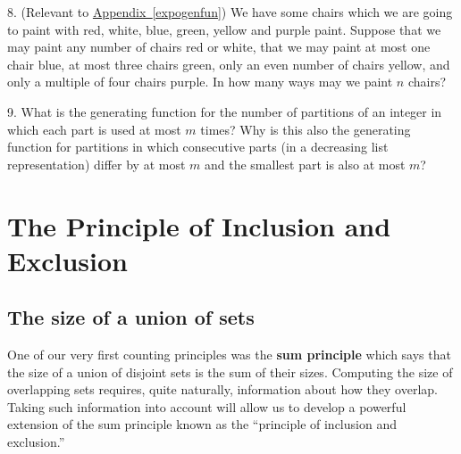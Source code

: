 \documentclass[10pt,]{book}
\newcommand{\terminology}[1]{\textbf{#1}}
\theoremstyle{plain}
\theoremstyle{definition}
\theoremstyle{definition}
\numberwithin{equation}{chapter}
\newcommand{\importantarrow}{\Rightarrow}
\begin{document}
\begin{exerciselist}
\par\smallskip
\item[8.]\marginsymbol[-1em]{\pdftooltip{$\importantarrow$}{especially interesting}} \hypertarget{exercise-44}{}\hypertarget{p-1312}{}%
(Relevant to \hyperref[expogenfun]{Appendix~\ref{expogenfun}}) We have some chairs which we are going to paint with red, white, blue, green, yellow and purple paint. Suppose that we may paint any number of chairs red or white, that we may paint at most one chair blue, at most three chairs green, only an even number of chairs yellow, and only a multiple of four chairs purple. In how many ways may we paint \(n\) chairs?%
\par\smallskip
\item[9.]\marginsymbol[-1em]{} \hypertarget{exercise-45}{}\hypertarget{p-1315}{}%
What is the generating function for the number of partitions of an integer in which each part is used at most \(m\) times? Why is this also the generating function for partitions in which consecutive parts (in a decreasing list representation) differ by at most \(m\) and the smallest part is also at most \(m\)?%
\par\smallskip
\end{exerciselist}
\typeout{************************************************}
\typeout{************************************************}
\chapter[{The Principle of Inclusion and Exclusion}]{The Principle of Inclusion and Exclusion}\label{ch_inclexcl}
\typeout{************************************************}
\typeout{************************************************}
\section[{The size of a union of sets}]{The size of a union of sets}\label{sec_inclexcl-sizeunion}
\hypertarget{p-1317}{}%
One of our very first counting principles was the \terminology{sum principle} which says that the size of a union of disjoint sets is the sum of their sizes. Computing the size of overlapping sets requires, quite naturally, information about how they overlap. Taking such information into account will allow us to develop a powerful extension of the sum principle known as the ``principle of inclusion and exclusion.''%
\typeout{************************************************}
\typeout{************************************************}
\end{document}
